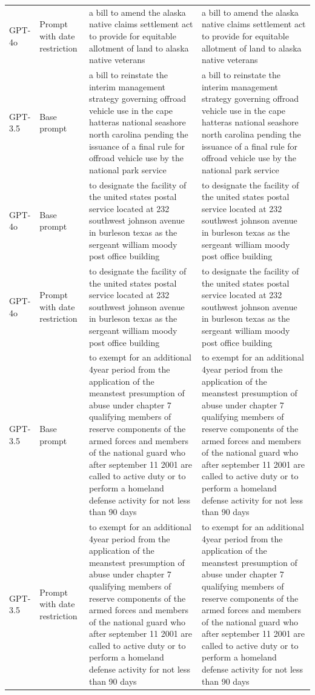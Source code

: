 \begin{longtable}{>{\raggedright\arraybackslash}p{1.4cm}>{\raggedright\arraybackslash}p{1.4cm}>{\raggedright\arraybackslash}p{5.5cm}>{\raggedright\arraybackslash}p{5.5cm}}
GPT-4o & Prompt with date restriction & a bill to amend the alaska native claims settlement act to provide for equitable allotment of land to alaska native veterans & a bill to amend the alaska native claims settlement act to provide for equitable allotment of land to alaska native veterans\\
GPT-3.5 & Base prompt & a bill to reinstate the interim management strategy governing offroad vehicle use in the cape hatteras national seashore north carolina pending the issuance of a final rule for offroad vehicle use by the national park service & a bill to reinstate the interim management strategy governing offroad vehicle use in the cape hatteras national seashore north carolina pending the issuance of a final rule for offroad vehicle use by the national park service\\
GPT-4o & Base prompt & to designate the facility of the united states postal service located at 232 southwest johnson avenue in burleson texas as the sergeant william moody post office building & to designate the facility of the united states postal service located at 232 southwest johnson avenue in burleson texas as the sergeant william moody post office building\\
GPT-4o & Prompt with date restriction & to designate the facility of the united states postal service located at 232 southwest johnson avenue in burleson texas as the sergeant william moody post office building & to designate the facility of the united states postal service located at 232 southwest johnson avenue in burleson texas as the sergeant william moody post office building\\
GPT-3.5 & Base prompt & to exempt for an additional 4year period from the application of the meanstest presumption of abuse under chapter 7 qualifying members of reserve components of the armed forces and members of the national guard who after september 11 2001 are called to active duty or to perform a homeland defense activity for not less than 90 days & to exempt for an additional 4year period from the application of the meanstest presumption of abuse under chapter 7 qualifying members of reserve components of the armed forces and members of the national guard who after september 11 2001 are called to active duty or to perform a homeland defense activity for not less than 90 days\\
GPT-3.5 & Prompt with date restriction & to exempt for an additional 4year period from the application of the meanstest presumption of abuse under chapter 7 qualifying members of reserve components of the armed forces and members of the national guard who after september 11 2001 are called to active duty or to perform a homeland defense activity for not less than 90 days & to exempt for an additional 4year period from the application of the meanstest presumption of abuse under chapter 7 qualifying members of reserve components of the armed forces and members of the national guard who after september 11 2001 are called to active duty or to perform a homeland defense activity for not less than 90 days\\

\end{longtable}
